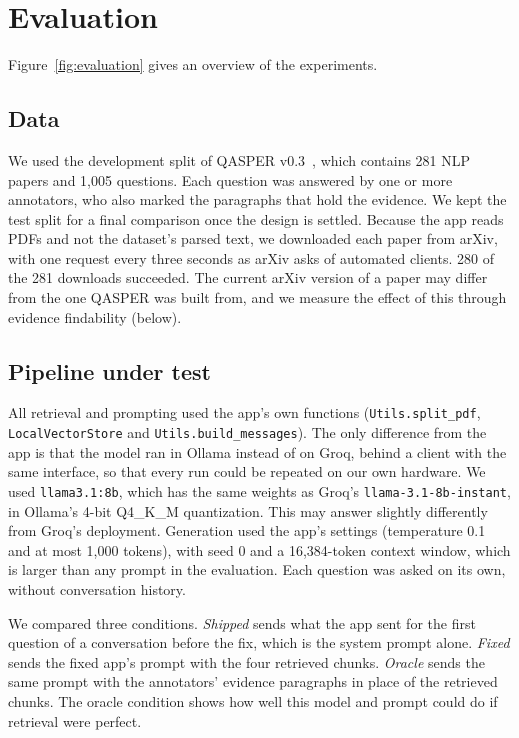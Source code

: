 \section{Evaluation}
\label{sec:evaluation}

Figure~\ref{fig:evaluation} gives an overview of the experiments.



\subsection{Data}

We used the development split of QASPER v0.3~\cite{dasigi2021qasper}, which contains 281 NLP
papers and 1,005 questions. Each question was answered by one or more annotators, who also
marked the paragraphs that hold the evidence. We kept the test split for a final comparison once
the design is settled. Because the app reads PDFs and not the dataset's parsed text, we
downloaded each paper from arXiv, with one request every three seconds as arXiv asks of automated
clients. 280 of the 281 downloads succeeded. The current arXiv version of a paper may differ from
the one QASPER was built from, and we measure the effect of this through evidence findability
(below).

\subsection{Pipeline under test}

All retrieval and prompting used the app's own functions (\texttt{Utils.split\_pdf},
\texttt{LocalVectorStore} and \texttt{Utils.build\_messages}). The only difference from the app
is that the model ran in Ollama instead of on Groq, behind a client with the same interface, so
that every run could be repeated on our own hardware. We used \texttt{llama3.1:8b}, which has the
same weights as Groq's \texttt{llama-3.1-8b-instant}, in Ollama's 4-bit Q4\_K\_M quantization.
This may answer slightly differently from Groq's deployment. Generation used the app's settings
(temperature 0.1 and at most 1,000 tokens), with seed 0 and a 16,384-token context window, which
is larger than any prompt in the evaluation. Each question was asked on its own, without
conversation history.

We compared three conditions. \emph{Shipped} sends what the app sent for the first question of a
conversation before the fix, which is the system prompt alone. \emph{Fixed} sends the fixed app's
prompt with the four retrieved chunks. \emph{Oracle} sends the same prompt with the annotators'
evidence paragraphs in place of the retrieved chunks. The oracle condition shows how well this
model and prompt could do if retrieval were perfect.

